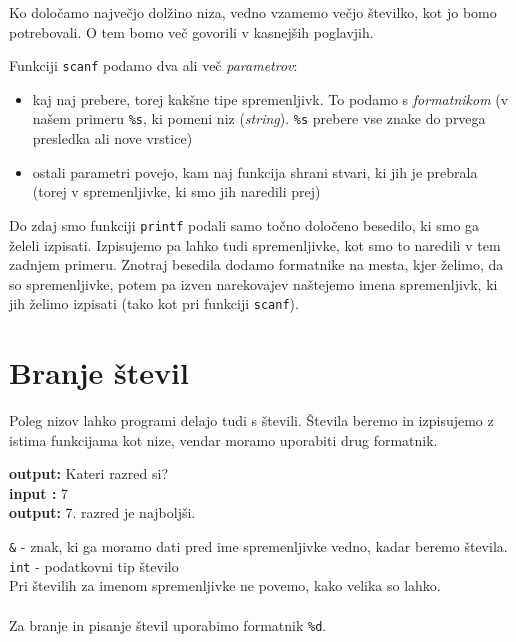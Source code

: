 \documentclass{book}
\begin{document}
\begin{errors} %
Ko določamo največjo dolžino niza, vedno vzamemo večjo številko, kot jo bomo potrebovali. O tem bomo več govorili v kasnejših poglavjih.
\end{errors}


Funkciji \verb+scanf+ podamo dva ali več \emph{parametrov}:
\begin{itemize}
	\item kaj naj prebere, torej kakšne tipe spremenljivk. To podamo s \emph{formatnikom} (v našem primeru \verb+%s+, ki pomeni niz (\emph{string}). \verb+%s+ prebere vse znake do prvega presledka ali nove vrstice)
	\item ostali parametri povejo, kam naj funkcija shrani stvari, ki jih je prebrala (torej v spremenljivke, ki smo jih naredili prej)
\end{itemize}


Do zdaj smo funkciji \verb+printf+ podali samo točno določeno besedilo, ki smo ga želeli izpisati. Izpisujemo pa lahko tudi spremenljivke, kot smo to naredili v tem zadnjem primeru. Znotraj besedila dodamo formatnike na mesta, kjer želimo, da so spremenljivke, potem pa izven narekovajev naštejemo imena spremenljivk, ki jih želimo izpisati (tako kot pri funkciji \verb+scanf+).

\section{Branje števil}
Poleg nizov lahko programi delajo tudi s števili. Števila beremo in izpisujemo z istima funkcijama kot nize, vendar moramo uporabiti drug formatnik.

\begin{examples}


\begin{inout}
{\color{blue} \bf output:} Kateri razred si?\\
{\color{blue} \bf input :} 7\\
{\color{blue} \bf output:} 7. razred je najboljši.
\end{inout}

\end{examples}

\verb+&+ - znak, ki ga moramo dati pred ime spremenljivke vedno, kadar beremo števila.
\verb+int+ - podatkovni tip število \\
Pri številih za imenom spremenljivke ne povemo, kako velika so lahko. \\\\
Za branje in pisanje števil uporabimo formatnik \verb+%d+.
\end{document}

